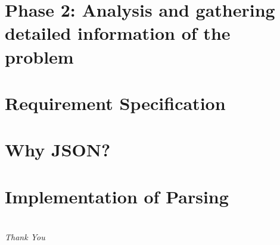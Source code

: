 \documentclass{beamer}
\begin{document}
\section{Phase 2: Analysis and gathering detailed information of the problem}


\section{Requirement Specification}


\section{Why JSON?}


\section{Implementation of Parsing}




% 





%
\section*{}
\begin{frame}{}
	\centering \Huge
	\emph{Thank You}
\end{frame}
\end{document}
